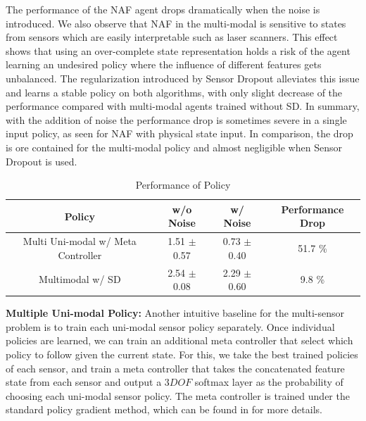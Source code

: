 \documentclass[../thesis.tex]{subfiles}
\begin{document}
The performance of the NAF agent drops dramatically when the noise is introduced. We also observe that NAF in the multi-modal is sensitive to states from sensors which are easily interpretable such as laser scanners. This effect shows that using an over-complete state representation holds a risk of the agent learning an undesired policy where the influence of different features gets unbalanced. The regularization introduced by Sensor Dropout alleviates this issue and learns a stable policy on both algorithms, with only slight decrease of the performance compared with multi-modal agents trained without SD. In summary, with the addition of noise the performance drop is sometimes severe in a single input policy, as seen for NAF with physical state input. In comparison, the drop is ore contained for the multi-modal policy and almost negligible when Sensor Dropout is used.


\begin{table}[t]
    \vskip 0.1in
    \caption{Performance of Policy }
    \label{table:multiple-uni-baseline}
    \vskip 0.1in
    \centering
    \begin{small}
    \begin{sc}
    \begin{tabular}{c|cc|c}
    \toprule 
    \centering
    Policy & w/o Noise & w/ Noise & Performance Drop \\ \midrule \midrule
     Multi Uni-modal w/ Meta Controller & 1.51 $\pm$ 0.57 & 0.73 $\pm$ 0.40 & 51.7 \% \\
     Multimodal w/ SD & 2.54 $\pm$ 0.08 & 2.29 $\pm$ 0.60 & 9.8 \% \\ \toprule
    \end{tabular}
    \end{sc}
    \end{small}
\end{table}

\textbf{Multiple Uni-modal Policy:}
Another intuitive baseline for the multi-sensor problem is to train each uni-modal sensor policy separately. Once individual policies are learned, we can train an additional meta controller that select which policy to follow given the current state.
For this, we take the best trained policies of each sensor, and train a meta controller that takes the concatenated feature state from each sensor and output a $3 DOF$ softmax layer as the probability of choosing each uni-modal sensor policy. The meta controller is trained under the standard policy gradient method, which can be found in \cite{}  for more details.
\end{document}
